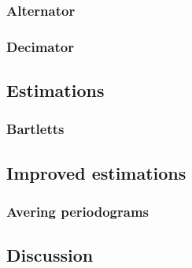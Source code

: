 \documentclass[a4paper,12pt]{article}
\begin{document}
\subsubsection{Alternator}


\subsubsection{Decimator}


\subsection{Estimations}


\subsubsection{Bartletts}


\subsection{Improved estimations}


\subsubsection{Avering periodograms}


\subsection{Discussion}
\end{document}
